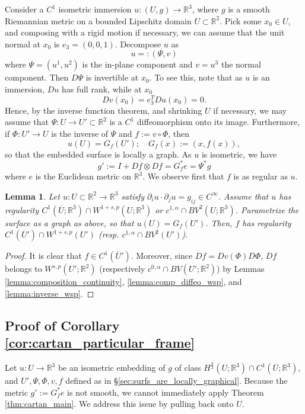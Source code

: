 \documentclass[12pt]{article}
\newcommand{\R}{\mathbb{R}}
\theoremstyle{plain}
\newtheorem{lemma}[theorem]{Lemma}
\numberwithin{equation}{section}
\begin{document}
Consider a $C^1$ isometric immersion $u : (U,g) \to \R^3$, where $g$ is a smooth Riemannian metric on a bounded Lipschitz domain $U \subset \R^2$. Pick some $x_0 \in U$, and composing with a rigid motion if necessary, we can assume that the unit normal at $x_0$ is $e_3=(0,0,1)$.
Decompose $u$ as
\begin{equation*}
u =: (\Psi,v)
\end{equation*}
where $\Psi = (u^1,u^2)$ is the in-plane component and $v=u^3$ the normal component. Then $D\Psi$ is invertible at $x_0$. To see this, note that as $u$ is an immersion, $Du$ has full rank, while at $x_0$
\begin{equation*}
    Dv(x_0) = e_3^T Du(x_0)  = 0.
\end{equation*}
Hence, by the inverse function theorem, and shrinking $U$ if necessary, we may assume that $\Psi : U \to U' \subset \R^2$ is a $C^1$ diffeomorphism onto its image. Furthermore, if $\Phi : U' \to U$ is the inverse of $\Psi$ and $f := v \circ \Phi$, then
\begin{equation*}
    u(U) = G_f(U'); \quad G_f(x) := (x,f(x)),
\end{equation*}
so that the embedded surface is locally a graph. As $u$ is isometric, we have
\begin{equation} \label{eq:gpr_from_f}
    g' := I+Df \otimes Df = G_f^*e = \Psi^*g
\end{equation}
where $e$ is the Euclidean metric on $\R^3$. We observe first that $f$ is as regular as $u$.
\begin{lemma} \label{lemma:f_smooth_as_u}
    Let $u : U \subset \R^2 \to \R^3$ satisfy $\partial_i u \cdot \partial_j u = g_{ij} \in C^\infty$. Assume that $u$ has regularity $C^1(\overline U; \R^3) \cap W^{1+s,p}(U;\R^3)$ or $c^{1,\alpha}\cap BV^2(U;\R^3)$. Parametrize the surface as a graph as above, so that $u(U) = G_f(U')$. Then, $f$ has regularity $C^1(\overline U') \cap W^{1+s,p}(U')$ (resp. $c^{1,\alpha} \cap BV^2(U')$). 
\end{lemma}
\begin{proof}
    It is clear that $f \in C^1(\overline U')$. Moreover, since $Df = Dv(\Phi)D\Phi$,  $Df$ belongs to $W^{s,p}(U';\R^2)$ (respectively $c^{0,\alpha} \cap BV(U';\R^2)$) by Lemmas \ref{lemma:composition_continuity}, \ref{lemma:comp_diffeo_wsp}, and \ref{lemma:inverse_wsp}.
\end{proof}

\subsection{Proof of Corollary \ref{cor:cartan_particular_frame}} \label{sec:proof_cartan_cor}
Let $u: U \to \R^3$ be an isometric embedding of $g$ of class $H^\frac32(U;\R^3) \cap C^1(\overline U; \R^3)$, and $U', \Psi, \Phi, v, f$ defined as in \S \ref{sec:surfs_are_locally_graphical}. Because the metric $g' := G_f^*e$ is not smooth, we cannot immediately apply Theorem \ref{thm:cartan_main}. We address this issue by pulling back onto $U$. 
\end{document}
